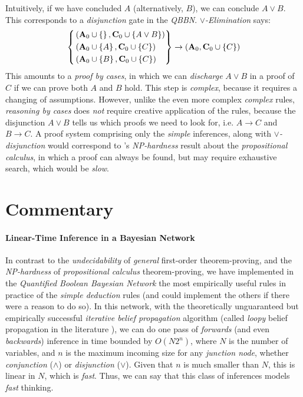 \documentclass[11pt]{article}
\begin{document}
Intuitively, if we have concluded $A$ (alternatively, $B$), we can conclude $A \lor B$.
This corresponds to a {\em disjunction} gate in the {\em QBBN}.
{\em $\lor$-Elimination} says:
\begin{equation}
    \left\{
    \begin{aligned}
        &\left({\bf A}_0 \cup \left\{\right\}, {\bf C}_0 \cup \left\{A \lor B\right\}\right) \\
        &\left({\bf A}_0 \cup \left\{A\right\}, {\bf C}_0 \cup \left\{C\right\}\right) \\
        &\left({\bf A}_0 \cup \left\{B\right\}, {\bf C}_0 \cup \left\{C\right\}\right) 
    \end{aligned}
    \right\}
    \rightarrow \left({\bf A}_0, {\bf C}_0 \cup \left\{C\right\}\right)
\end{equation}
This amounts to a {\em proof by cases}, in which we can {\em discharge} $A \lor B$ in a proof of $C$ if we can prove both $A$ and $B$ hold.
This step is {\em complex}, because it requires a changing of assumptions.
However, unlike the even more complex {\em complex} rules, {\em reasoning by cases} does {\em not} require creative application of the rules, because the disjunction $A \lor B$ tells us which proofs we need to look for, i.e. $A\rightarrow C$ and $B \rightarrow C$.
A proof system comprising only the {\em simple} inferences, along with {\em $\lor$-disjunction} would correspond to \cite{Cook1971}'s {\em NP-hardness} result about the {\em propositional calculus}, in which a proof can always be found, but may require exhaustive search, which would be {\em slow}.

\section*{Commentary}
\paragraph{Linear-Time Inference in a Bayesian Network}
In contrast to the {\em undecidability} of {\em general} first-order theorem-proving, and the {\em NP-hardness} of {\em propositional calculus} theorem-proving, we have implemented in the {\em Quantified Boolean Bayesian Network} \cite{Coppola2024} the most empirically useful rules in practice of the {\em simple deduction} rules (and could implement the others if there were a reason to do so).
In this network, with the theoretically unguaranteed but empirically successful {\em iterative belief propagation} algorithm (called {\em loopy} belief propagation in the literature \cite{koller2009probabilistic}), we can do one pass of {\em forwards} (and even {\em backwards}) inference in time bounded by $O(N2^n)$, where $N$ is the number of variables, and $n$ is the maximum incoming size for any {\em junction node}, whether {\em conjunction} ($\land$) or {\em disjunction} ($\lor$).
Given that $n$ is much smaller than $N$, this is linear in $N$, which is {\em fast}.
Thus, we can say that this class of inferences models {\em fast} thinking.
\end{document}

